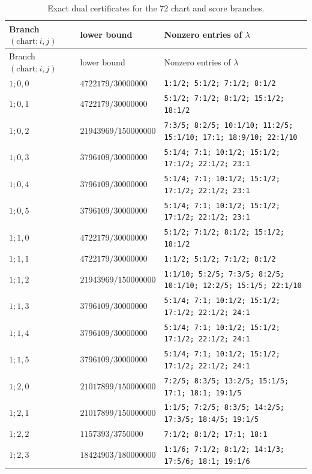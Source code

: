\setlength{\tabcolsep}{2pt}
\scriptsize
\begin{longtable}{@{}p{}p{}p{}@{}}
\caption{Exact dual certificates for the 72 chart and score branches.}\label{tab:branchcert}\\
\toprule
Branch $(\mathrm{chart};i,j)$ & lower bound & Nonzero entries of $\lambda$\\
\midrule
\endfirsthead
\toprule
Branch $(\mathrm{chart};i,j)$ & lower bound & Nonzero entries of $\lambda$\\
\midrule
\endhead
$1;0,0$ & $4722179/30000000$ & \texttt{1:1/2; 5:1/2; 7:1/2; 8:1/2} \\
$1;0,1$ & $4722179/30000000$ & \texttt{5:1/2; 7:1/2; 8:1/2; 15:1/2; 18:1/2} \\
$1;0,2$ & $21943969/150000000$ & \texttt{7:3/5; 8:2/5; 10:1/10; 11:2/5; 15:1/10; 17:1; 18:9/10; 22:1/10} \\
$1;0,3$ & $3796109/30000000$ & \texttt{5:1/4; 7:1; 10:1/2; 15:1/2; 17:1/2; 22:1/2; 23:1} \\
$1;0,4$ & $3796109/30000000$ & \texttt{5:1/4; 7:1; 10:1/2; 15:1/2; 17:1/2; 22:1/2; 23:1} \\
$1;0,5$ & $3796109/30000000$ & \texttt{5:1/4; 7:1; 10:1/2; 15:1/2; 17:1/2; 22:1/2; 23:1} \\
$1;1,0$ & $4722179/30000000$ & \texttt{5:1/2; 7:1/2; 8:1/2; 15:1/2; 18:1/2} \\
$1;1,1$ & $4722179/30000000$ & \texttt{1:1/2; 5:1/2; 7:1/2; 8:1/2} \\
$1;1,2$ & $21943969/150000000$ & \texttt{1:1/10; 5:2/5; 7:3/5; 8:2/5; 10:1/10; 12:2/5; 15:1/5; 22:1/10} \\
$1;1,3$ & $3796109/30000000$ & \texttt{5:1/4; 7:1; 10:1/2; 15:1/2; 17:1/2; 22:1/2; 24:1} \\
$1;1,4$ & $3796109/30000000$ & \texttt{5:1/4; 7:1; 10:1/2; 15:1/2; 17:1/2; 22:1/2; 24:1} \\
$1;1,5$ & $3796109/30000000$ & \texttt{5:1/4; 7:1; 10:1/2; 15:1/2; 17:1/2; 22:1/2; 24:1} \\
$1;2,0$ & $21017899/150000000$ & \texttt{7:2/5; 8:3/5; 13:2/5; 15:1/5; 17:1; 18:1; 19:1/5} \\
$1;2,1$ & $21017899/150000000$ & \texttt{1:1/5; 7:2/5; 8:3/5; 14:2/5; 17:3/5; 18:4/5; 19:1/5} \\
$1;2,2$ & $1157393/3750000$ & \texttt{7:1/2; 8:1/2; 17:1; 18:1} \\
$1;2,3$ & $18424903/180000000$ & \texttt{1:1/6; 7:1/2; 8:1/2; 14:1/3; 17:5/6; 18:1; 19:1/6} \\

\end{longtable}
